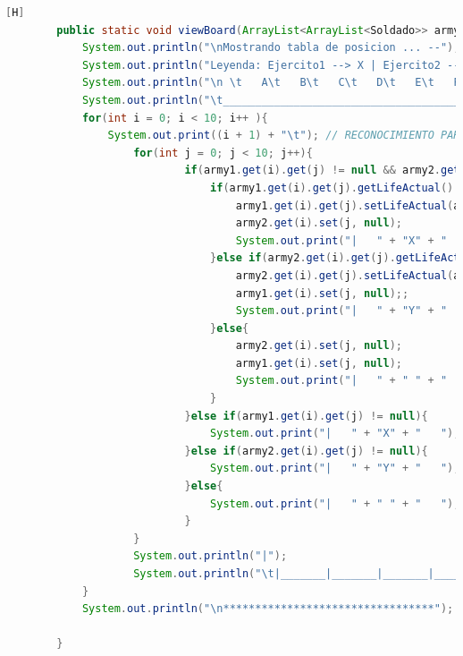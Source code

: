 \documentclass{article}
\begin{document}
	\begin{lstlisting}[language=java,caption={Las lineas de codigos del metodo creado:}][H]
		public static void viewBoard(ArrayList<ArrayList<Soldado>> army1, ArrayList<ArrayList<Soldado>> army2){ //EN ESTE METODO DEMOSTRAREMOS LA TABLA REUTILIZAREMOS CODIGOS DE ANTERIORES LABORATORIOS PARA PODER HACER LA BASE DE ESTE TABLERO
			System.out.println("\nMostrando tabla de posicion ... --");
			System.out.println("Leyenda: Ejercito1 --> X | Ejercito2 --> Y"); //RECONOCIMIENTO PARA LOS EJERCITOS Y POSICION DE SUS SOLDADOS
			System.out.println("\n \t   A\t   B\t   C\t   D\t   E\t   F\t   G\t   H\t   I\t   J"); // RECONOCIMIENTO PARA CADA UBICACION DE CADA SOLDADO EN EL TABLERO POR PARTE DE LAS COLUMNAS
			System.out.println("\t_________________________________________________________________________________");
			for(int i = 0; i < 10; i++ ){
				System.out.print((i + 1) + "\t"); // RECONOCIMIENTO PARA CADA UBICACION DE CADA SOLDADO EN EL TABLERO POR PARTE DE LAS FILAS
					for(int j = 0; j < 10; j++){
							if(army1.get(i).get(j) != null && army2.get(i).get(j) != null){ //CREAMOS UN IF PARA QUE ESTE NOS AYUDE A SABER QUIEN DE ESTOS SOLDADOS SE OCUPARA DEL CASILLERO EL CUAL DONDE ESTAN PELEANDO
								if(army1.get(i).get(j).getLifeActual() > army2.get(i).get(j).getLifeActual()){
									army1.get(i).get(j).setLifeActual(army1.get(i).get(j).getLifeActual() - army2.get(i).get(j).getLifeActual()); //Cambiamos 
									army2.get(i).set(j, null); 
									System.out.print("|   " + "X" + "   ");
								}else if(army2.get(i).get(j).getLifeActual() > army1.get(i).get(j).getLifeActual()){
									army2.get(i).get(j).setLifeActual(army2.get(i).get(j).getLifeActual() - army1.get(i).get(j).getLifeActual());
									army1.get(i).set(j, null);;
									System.out.print("|   " + "Y" + "   ");
								}else{
									army2.get(i).set(j, null);
									army1.get(i).set(j, null);
									System.out.print("|   " + " " + "   ");
								}
							}else if(army1.get(i).get(j) != null){
								System.out.print("|   " + "X" + "   ");
							}else if(army2.get(i).get(j) != null){
								System.out.print("|   " + "Y" + "   ");
							}else{
								System.out.print("|   " + " " + "   ");
							}
					}
					System.out.println("|");
					System.out.println("\t|_______|_______|_______|_______|_______|_______|_______|_______|_______|_______|");
			}
			System.out.println("\n*********************************");

		}

	\end{lstlisting}
\end{document}
